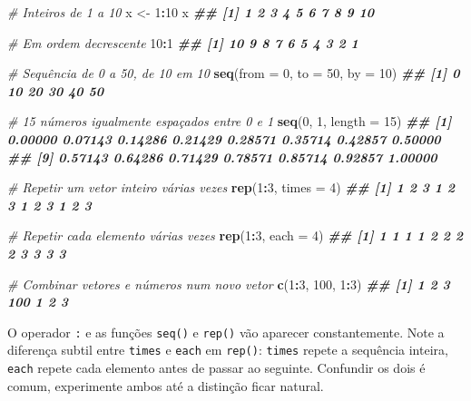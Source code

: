 \documentclass[
  portuguese,
  11pt,
  openany]{book}
\newenvironment{Shaded}{\begin{snugshade}}{\end{snugshade}}
\newcommand{\AttributeTok}[1]{\textcolor[rgb]{0.13,0.29,0.53}{#1}}
\newcommand{\CommentTok}[1]{\textcolor[rgb]{0.56,0.35,0.01}{\textit{#1}}}
\newcommand{\DecValTok}[1]{\textcolor[rgb]{0.00,0.00,0.81}{#1}}
\newcommand{\DocumentationTok}[1]{\textcolor[rgb]{0.56,0.35,0.01}{\textbf{\textit{#1}}}}
\newcommand{\FunctionTok}[1]{\textcolor[rgb]{0.13,0.29,0.53}{\textbf{#1}}}
\newcommand{\NormalTok}[1]{#1}
\newcommand{\OtherTok}[1]{\textcolor[rgb]{0.56,0.35,0.01}{#1}}
\newcommand{\SpecialCharTok}[1]{\textcolor[rgb]{0.81,0.36,0.00}{\textbf{#1}}}
\begin{document}
\begin{Shaded}
\begin{Highlighting}[]
\CommentTok{\# Inteiros de 1 a 10}
\NormalTok{x }\OtherTok{\textless{}{-}} \DecValTok{1}\SpecialCharTok{:}\DecValTok{10}
\NormalTok{x}
\DocumentationTok{\#\#  [1]  1  2  3  4  5  6  7  8  9 10}

\CommentTok{\# Em ordem decrescente}
\DecValTok{10}\SpecialCharTok{:}\DecValTok{1}
\DocumentationTok{\#\#  [1] 10  9  8  7  6  5  4  3  2  1}

\CommentTok{\# Sequência de 0 a 50, de 10 em 10}
\FunctionTok{seq}\NormalTok{(}\AttributeTok{from =} \DecValTok{0}\NormalTok{, }\AttributeTok{to =} \DecValTok{50}\NormalTok{, }\AttributeTok{by =} \DecValTok{10}\NormalTok{)}
\DocumentationTok{\#\# [1]  0 10 20 30 40 50}

\CommentTok{\# 15 números igualmente espaçados entre 0 e 1}
\FunctionTok{seq}\NormalTok{(}\DecValTok{0}\NormalTok{, }\DecValTok{1}\NormalTok{, }\AttributeTok{length =} \DecValTok{15}\NormalTok{)}
\DocumentationTok{\#\#  [1] 0.00000 0.07143 0.14286 0.21429 0.28571 0.35714 0.42857 0.50000}
\DocumentationTok{\#\#  [9] 0.57143 0.64286 0.71429 0.78571 0.85714 0.92857 1.00000}

\CommentTok{\# Repetir um vetor inteiro várias vezes}
\FunctionTok{rep}\NormalTok{(}\DecValTok{1}\SpecialCharTok{:}\DecValTok{3}\NormalTok{, }\AttributeTok{times =} \DecValTok{4}\NormalTok{)}
\DocumentationTok{\#\#  [1] 1 2 3 1 2 3 1 2 3 1 2 3}

\CommentTok{\# Repetir cada elemento várias vezes}
\FunctionTok{rep}\NormalTok{(}\DecValTok{1}\SpecialCharTok{:}\DecValTok{3}\NormalTok{, }\AttributeTok{each =} \DecValTok{4}\NormalTok{)}
\DocumentationTok{\#\#  [1] 1 1 1 1 2 2 2 2 3 3 3 3}

\CommentTok{\# Combinar vetores e números num novo vetor}
\FunctionTok{c}\NormalTok{(}\DecValTok{1}\SpecialCharTok{:}\DecValTok{3}\NormalTok{, }\DecValTok{100}\NormalTok{, }\DecValTok{1}\SpecialCharTok{:}\DecValTok{3}\NormalTok{)}
\DocumentationTok{\#\# [1]   1   2   3 100   1   2   3}
\end{Highlighting}
\end{Shaded}

O operador \texttt{:} e as funções \texttt{seq()} e \texttt{rep()} vão aparecer constantemente. Note a
diferença subtil entre \texttt{times} e \texttt{each} em \texttt{rep()}: \texttt{times} repete a sequência
inteira, \texttt{each} repete cada elemento antes de passar ao seguinte. Confundir os
dois é comum, experimente ambos até a distinção ficar natural.
\end{document}
